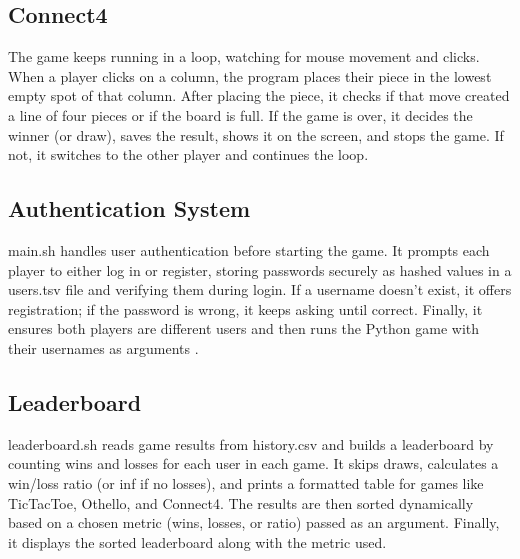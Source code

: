 \documentclass{article}
\begin{document}
\subsection{Connect4}
The game keeps running in a loop, watching for mouse movement and clicks. When a player clicks on a column, the program places their piece in the lowest empty spot of that column. After placing the piece, it checks if that move created a line of four pieces or if the board is full.
If the game is over, it decides the winner (or draw), saves the result, shows it on the screen, and stops the game. If not, it switches to the other player and continues the loop.
\subsection{Authentication System }
main.sh handles user authentication before starting the game. It prompts each player to either log in or register, storing passwords securely as hashed values in a users.tsv file and verifying them during login. If a username doesn’t exist, it offers registration; if the password is wrong, it keeps asking until correct. Finally, it ensures both players are different users and then runs the Python game with their usernames as arguments \cite{bash_docs}.
\subsection{Leaderboard}
leaderboard.sh reads game results from history.csv and builds a leaderboard by counting wins and losses for each user in each game. It skips draws, calculates a win/loss ratio (or inf if no losses), and prints a formatted table for games like TicTacToe, Othello, and Connect4. The results are then sorted dynamically based on a chosen metric (wins, losses, or ratio) passed as an argument. Finally, it displays the sorted leaderboard along with the metric used.
\end{document}
